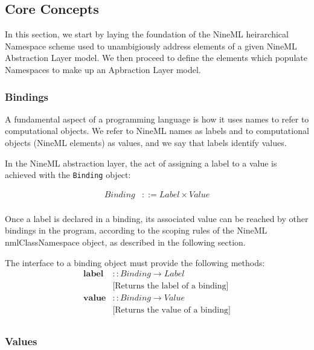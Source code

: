 \documentclass[a4paper]{article}
\newcommand\nmlClass[1]{{\tt #1}}
\begin{document}
\subsection{Core Concepts}

In this section, we start by laying the foundation of the NineML
heirarchical Namespace scheme used to unambigiously address elements
of a given NineML Abstraction Layer model.  We then proceed to define the elements 
which populate Namespaces to make up an Apbraction Layer model. 

\subsubsection{Bindings}

A fundamental aspect of a programming language is how it uses names to
refer to computational objects.  We refer to NineML names as labels
and to computational objects (NineML elements) as values, and we say that labels
identify values.

In the NineML abstraction layer, the act of assigning a label to a value is achieved
with the \nmlClass{Binding} object:

\begin{equation*}
\begin{array}{ll}
   Binding & ::= Label \times Value \\
\end{array}
\end{equation*}

Once a label is declared in a binding, its associated value can be
reached by other bindings in the program, according to the scoping
rules of the NineML nmlClass{Namespace} object, as described in the
following section.

The interface to a binding object must provide the following methods:
\begin{equation*}
\begin{array}{ll}
   \mathbf{label} & :: Binding \rightarrow Label \\ & \textrm{[Returns the label of a binding]} \\
   \mathbf{value} & :: Binding \rightarrow Value \\ & \textrm{[Returns the value of a binding]} \\
\end{array}
\end{equation*}




\subsubsection{Values}
\end{document}
